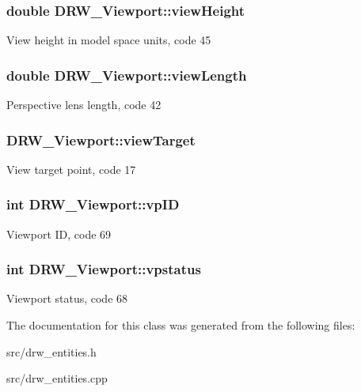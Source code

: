 \subsubsection[{view\+Height}]{\setlength{\rightskip}{0pt plus 5cm}double D\+R\+W\+\_\+\+Viewport\+::view\+Height}\label{class_d_r_w___viewport_a58791e7b528bdaaa6f1ca0572c7321ea}
View height in model space units, code 45 \hypertarget{class_d_r_w___viewport_a5350736f5091de23f63b13586aab6ff5}{}
\subsubsection[{view\+Length}]{\setlength{\rightskip}{0pt plus 5cm}double D\+R\+W\+\_\+\+Viewport\+::view\+Length}\label{class_d_r_w___viewport_a5350736f5091de23f63b13586aab6ff5}
Perspective lens length, code 42 \hypertarget{class_d_r_w___viewport_aa33f15bb04421b33772d4ba7473a272c}{}
\subsubsection[{view\+Target}]{ D\+R\+W\+\_\+\+Viewport\+::view\+Target}\label{class_d_r_w___viewport_aa33f15bb04421b33772d4ba7473a272c}
View target point, code 17 \hypertarget{class_d_r_w___viewport_adbec007a8c4b56acd1a55238aca29250}{}
\subsubsection[{vp\+I\+D}]{\setlength{\rightskip}{0pt plus 5cm}int D\+R\+W\+\_\+\+Viewport\+::vp\+I\+D}\label{class_d_r_w___viewport_adbec007a8c4b56acd1a55238aca29250}
Viewport I\+D, code 69 \hypertarget{class_d_r_w___viewport_a5d894c4b220ebb89e7b2f368a02c6a65}{}
\subsubsection[{vpstatus}]{\setlength{\rightskip}{0pt plus 5cm}int D\+R\+W\+\_\+\+Viewport\+::vpstatus}\label{class_d_r_w___viewport_a5d894c4b220ebb89e7b2f368a02c6a65}
Viewport status, code 68 

The documentation for this class was generated from the following files\+:\begin{DoxyCompactItemize}
\item 
src/drw\+\_\+entities.\+h\item 
src/drw\+\_\+entities.\+cpp\end{DoxyCompactItemize}
